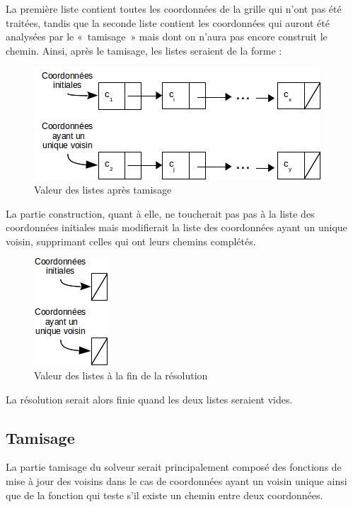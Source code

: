 La première liste contient toutes les coordonnées de la grille qui n'ont pas été traitées, tandis que la seconde liste contient les coordonnées qui auront été analysées par le «~tamisage~» mais dont on n'aura pas encore construit le chemin. Ainsi, après le tamisage, les listes seraient de la forme :

\begin{figure}[h]
      \centering
      \includegraphics[scale=0.5]{solveur-listes2}
      \caption{Valeur des listes après tamisage}
\end{figure}

La partie construction, quant à elle, ne toucherait pas pas à la liste des coordonnées initiales mais modifierait la liste des coordonnées ayant un unique voisin, supprimant celles qui ont leurs chemins complétés.


\begin{figure}[h!]
      \centering
      \includegraphics[scale=0.5]{solveur-listes3}
      \caption{Valeur des listes à la fin de la résolution}
\end{figure}

La résolution serait alors finie quand les deux listes seraient vides.

\subsection{Tamisage}

La partie tamisage du solveur serait principalement composé des fonctions de mise à jour des voisins dans le cas de coordonnées ayant un voisin unique ainsi que de la fonction qui teste s'il existe un chemin entre deux coordonnées.

